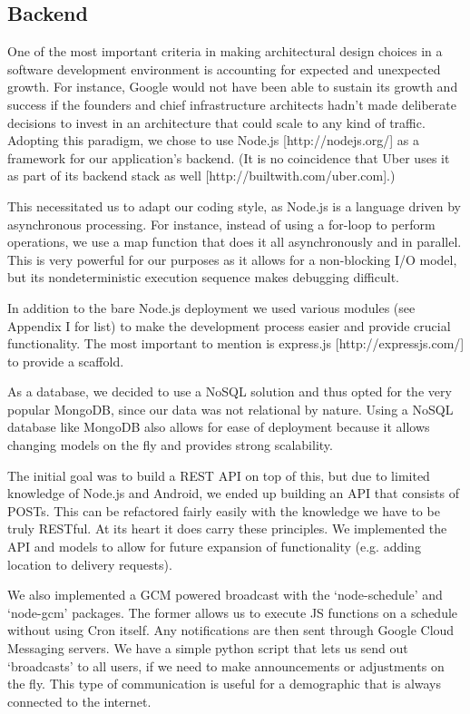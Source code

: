 \documentclass{acm_proc_article-sp}
\begin{document}
\subsection{Backend}
\smallskip
One of the most important criteria in making architectural design choices in a software development environment is accounting for expected and unexpected growth. For instance, Google would not have been able to sustain its growth and success if the founders and chief infrastructure architects hadn't made deliberate decisions to invest in an architecture that could scale to any kind of traffic. Adopting this paradigm, we chose to use Node.js [http://nodejs.org/] as a framework for our application’s backend. (It is no coincidence that Uber uses it as part of its backend stack as well [http://builtwith.com/uber.com].)

This necessitated us to adapt our coding style, as Node.js is a language driven by asynchronous processing. For instance, instead of using a for-loop to perform operations, we use a map function that does it all asynchronously and in parallel. This is very powerful for our purposes as it allows for a non-blocking I/O model, but its nondeterministic execution sequence makes debugging difficult.

In addition to the bare Node.js deployment we used various modules (see Appendix I for list) to make the development process easier and provide crucial functionality. The most important to mention is express.js [http://expressjs.com/] to provide a scaffold.

As a database, we decided to use a NoSQL solution and thus opted for the very popular MongoDB, since our data was not relational by nature. Using a NoSQL database like MongoDB also allows for ease of deployment because it allows changing models on the fly and provides strong scalability.

The initial goal was to build a REST API on top of this, but due to limited knowledge of Node.js and Android, we ended up building an API that consists of POSTs. This can be refactored fairly easily with the knowledge we have to be truly RESTful. At its heart it does carry these principles. We implemented the API and models to allow for future expansion of functionality (e.g. adding location to delivery requests).

We also implemented a GCM powered broadcast with the ‘node-schedule’ and ‘node-gcm’ packages. The former allows us to execute JS functions on a schedule without using Cron itself. Any notifications are then sent through Google Cloud Messaging servers. We have a simple python script that lets us send out ‘broadcasts’ to all users, if we need to make announcements or adjustments on the fly. This type of communication is useful for a demographic that is always connected to the internet.
\end{document}
